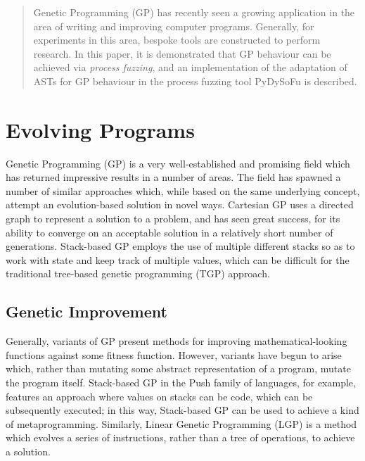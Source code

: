 \documentclass[12pt]{llncs} %
\begin{document}
\maketitle

\begin{abstract}
  Genetic Programming (GP) has recently seen a growing application in the area
  of writing and improving computer programs. Generally, for experiments in this
  area, bespoke tools are constructed to perform research. In this paper, it is
  demonstrated that GP behaviour can be achieved via \emph{process fuzzing}, and
  an implementation of the adaptation of ASTs for GP behaviour in the process
  fuzzing tool PyDySoFu is described.
\end{abstract}


\section{Evolving Programs} Genetic Programming (GP) is a very well-established
and promising field which has returned impressive results in a number of areas.
The field has spawned a number of similar approaches which, while based on the
same underlying concept, attempt an evolution-based solution in novel ways.
Cartesian GP\cite{miller2011cartesian} uses a directed graph to represent a
solution to a problem, and has seen great success, for its ability to converge
on an acceptable solution in a relatively short number of generations.
Stack-based GP\cite{perkis1994stack} employs the use of multiple different
stacks so as to work with state and keep track of multiple values, which can be
difficult for the traditional tree-based genetic programming (TGP) approach.\par

\subsection{Genetic Improvement}
Generally, variants of GP present methods for improving mathematical-looking
functions against some fitness function. However, variants have begun to arise
which, rather than mutating some abstract representation of a program, mutate
the program itself. Stack-based GP in the Push family of
languages\cite{spector2001autoconstructive}, for example, features an approach
where values on stacks can be code, which can be subsequently executed; in this
way, Stack-based GP can be used to achieve a kind of metaprogramming. Similarly,
Linear Genetic Programming\cite{brameier2007linear} (LGP) is a method which
evolves a series of instructions, rather than a tree of operations, to achieve a
solution.\par
\end{document}
